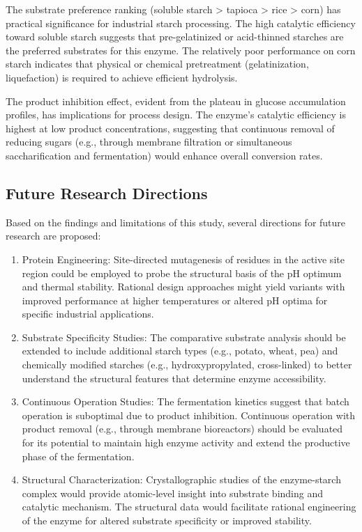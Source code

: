 \documentclass[
  12pt,
]{article}
\begin{document}
The substrate preference ranking (soluble starch \textgreater{} tapioca
\textgreater{} rice \textgreater{} corn) has practical significance for
industrial starch processing. The high catalytic efficiency toward
soluble starch suggests that pre-gelatinized or acid-thinned starches
are the preferred substrates for this enzyme. The relatively poor
performance on corn starch indicates that physical or chemical
pretreatment (gelatinization, liquefaction) is required to achieve
efficient hydrolysis.

The product inhibition effect, evident from the plateau in glucose
accumulation profiles, has implications for process design. The enzyme's
catalytic efficiency is highest at low product concentrations,
suggesting that continuous removal of reducing sugars (e.g., through
membrane filtration or simultaneous saccharification and fermentation)
would enhance overall conversion rates.

\subsection{Future Research
Directions}\label{future-research-directions}

Based on the findings and limitations of this study, several directions
for future research are proposed:

\begin{enumerate}
\def\labelenumi{\arabic{enumi}.}
\item
  Protein Engineering: Site-directed mutagenesis of residues in the
  active site region could be employed to probe the structural basis of
  the pH optimum and thermal stability. Rational design approaches might
  yield variants with improved performance at higher temperatures or
  altered pH optima for specific industrial applications.
\item
  Substrate Specificity Studies: The comparative substrate analysis
  should be extended to include additional starch types (e.g., potato,
  wheat, pea) and chemically modified starches (e.g., hydroxypropylated,
  cross-linked) to better understand the structural features that
  determine enzyme accessibility.
\item
  Continuous Operation Studies: The fermentation kinetics suggest that
  batch operation is suboptimal due to product inhibition. Continuous
  operation with product removal (e.g., through membrane bioreactors)
  should be evaluated for its potential to maintain high enzyme activity
  and extend the productive phase of the fermentation.
\item
  Structural Characterization: Crystallographic studies of the
  enzyme-starch complex would provide atomic-level insight into
  substrate binding and catalytic mechanism. The structural data would
  facilitate rational engineering of the enzyme for altered substrate
  specificity or improved stability.
\end{enumerate}
\end{document}
